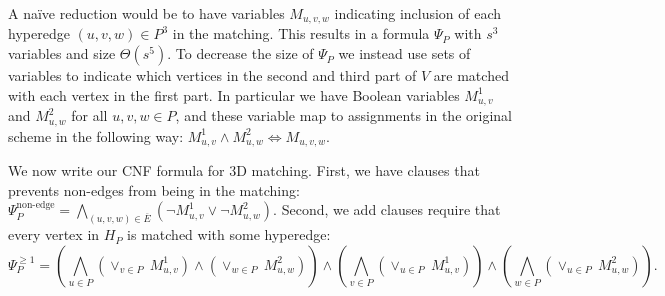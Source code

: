\documentclass[11pt]{article}
\begin{document}
A na\"{i}ve reduction would be to have variables $M_{u,v,w}$ indicating inclusion of each
hyperedge $(u,v,w) \in P^3$ in the matching. This results in a formula $\Psi_P$ with
$s^3$ variables and size $\Theta(s^5)$.
To decrease the size of $\Psi_P$ we instead use sets
of variables to indicate which vertices in the second and third part of $V$
are matched with each vertex in the first part.  In particular we have
Boolean variables $M_{u,v}^1$ and $M_{u,w}^2$ for all $u, v, w \in P$,
and these variable map to assignments in the original scheme in the
following way: $M_{u,v}^1 \wedge M_{u,w}^2 \Leftrightarrow M_{u,v,w}$.

We now write our CNF formula for 3D matching.  First, we have clauses that prevents non-edges from
being in the matching:
  $\Psi_P^{\text{non-edge}} = \bigwedge_{(u,v,w) \in \overline{E}}
  (\neg M_{u,v}^1 \vee \neg M_{u,w}^2).$
Second, we add clauses require that every vertex in $H_P$ is matched with some
hyperedge:
\begin{equation}
  \Psi_P^{\ge 1} =
  \left(\bigwedge_{u \in P} (\vee_{v\in P} ~M_{u,v}^1) \wedge (\vee_{w \in P} ~M_{u,w}^2)\right)
  \wedge \left(\bigwedge_{v \in P} (\vee_{u \in P} ~M_{u,v}^1)\right)
  \wedge \left(\bigwedge_{w \in P} (\vee_{u \in P} ~M_{u,w}^2)\right).
\end{equation}
\end{document}
